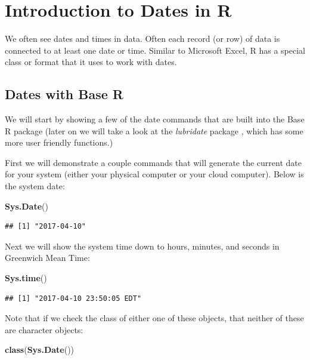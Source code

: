 \documentclass[]{book}
\newenvironment{Shaded}{\begin{snugshade}}{\end{snugshade}}
\newcommand{\KeywordTok}[1]{\textcolor[rgb]{0.13,0.29,0.53}{\textbf{{#1}}}}
\newcommand{\NormalTok}[1]{{#1}}
\begin{document}
\chapter{Introduction to Dates in R}\label{introduction-to-dates-in-r}

We often see dates and times in data. Often each record (or row) of data
is connected to at least one date or time. Similar to Microsoft Excel, R
has a special class or format that it uses to work with dates.

\section{Dates with Base R}\label{dates-with-base-r}

We will start by showing a few of the date commands that are built into
the Base R package (later on we will take a look at the \emph{lubridate}
package \citep{R-lubridate}, which has some more user friendly
functions.)

First we will demonstrate a couple commands that will generate the
current date for your system (either your physical computer or your
cloud computer). Below is the system date:

\begin{Shaded}
\begin{Highlighting}[]
\KeywordTok{Sys.Date}\NormalTok{()}
\end{Highlighting}
\end{Shaded}

\begin{verbatim}
## [1] "2017-04-10"
\end{verbatim}

Next we will show the system time down to hours, minutes, and seconds in
Greenwich Mean Time:

\begin{Shaded}
\begin{Highlighting}[]
\KeywordTok{Sys.time}\NormalTok{()}
\end{Highlighting}
\end{Shaded}

\begin{verbatim}
## [1] "2017-04-10 23:50:05 EDT"
\end{verbatim}

Note that if we check the class of either one of these objects, that
neither of these are character objects:

\begin{Shaded}
\begin{Highlighting}[]
\KeywordTok{class}\NormalTok{(}\KeywordTok{Sys.Date}\NormalTok{())}
\end{Highlighting}
\end{Shaded}
\end{document}
